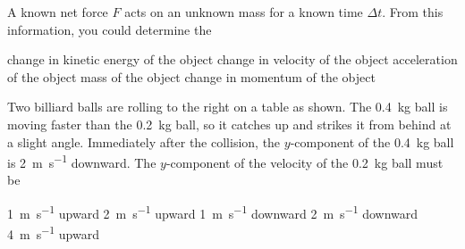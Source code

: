 \documentclass{../../../oss-classkick-exam}
\begin{document}
\begin{multicols*}{2}
\begin{questions}
    \question A known net force $F$ acts on an unknown mass for a known time
    $\Delta t$. From this information, you could determine the
    \begin{choices}
      \choice change in kinetic energy of the object
      \choice change in velocity of the object
      \choice acceleration of the object
      \choice mass of the object
      \choice change in momentum of the object
    \end{choices}
    \columnbreak
    
    \question Two billiard balls are rolling to the right on a table as shown.
    The \SI{.4}{\kilo\gram} ball is moving faster than the \SI{.2}{\kilo\gram}
    ball, so it catches up and strikes it from behind at a slight angle.
    Immediately after the collision, the $y$-component of the
    \SI{.4}{\kilo\gram} ball is \SI{2}{\metre\per\second} downward.
    The $y$-component of the velocity of the \SI{.2}{\kilo\gram} ball must be
    \begin{center}
    \end{center}
    \begin{choices}
      \choice\SI{1}{\metre\per\second} upward
      \choice\SI{2}{\metre\per\second} upward
      \choice\SI{1}{\metre\per\second} downward
      \choice\SI{2}{\metre\per\second} downward
      \choice\SI{4}{\metre\per\second} upward
    \end{choices}
    

\end{questions}
\end{multicols*}
\end{document}
